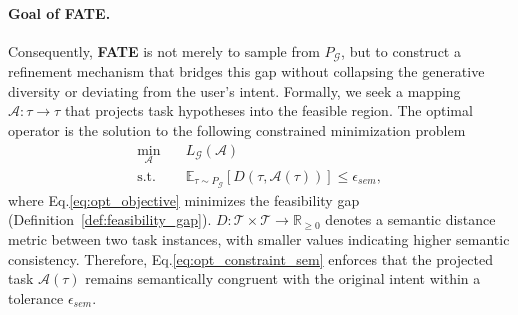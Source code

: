 \documentclass{article}
\theoremstyle{plain}
\theoremstyle{definition}
\newtheorem{definition}[theorem]{Definition}
\theoremstyle{remark}
\begin{document}
\paragraph{Goal of FATE.} Consequently, \textbf{FATE} is not merely to sample from $P_{\mathcal{G}}$, but to construct a refinement mechanism that bridges this gap without collapsing the generative diversity or deviating from the user's intent. Formally, we seek a mapping $\mathcal{A}: \tau \to \tau$ that projects task hypotheses into the feasible region. The optimal operator is the solution to the following constrained minimization problem
\begin{subequations}
\label{eq:FATE_optimization_target_func}
\begin{align}
    \min_{\mathcal{A}} \quad & L_{\mathcal{G}}(\mathcal{A}) \label{eq:opt_objective} \\
    \textrm{s.t.} \quad & \mathbb{E}_{\tau \sim P_{\mathcal{G}}} [D(\tau, \mathcal{A}(\tau))] \le \epsilon_{sem} \label{eq:opt_constraint_sem},
\end{align}
\end{subequations}
where Eq.\eqref{eq:opt_objective} minimizes the feasibility gap (Definition~\ref{def:feasibility_gap}). $D:\mathcal{T}\times\mathcal{T}\to\mathbb{R}_{\ge 0}$ denotes a semantic distance metric between two task instances, with smaller values indicating higher semantic consistency. Therefore, Eq.\eqref{eq:opt_constraint_sem} enforces that the projected task $\mathcal{A}(\tau)$ remains semantically congruent with the original intent within a tolerance $\epsilon_{sem}$.


\end{document}
